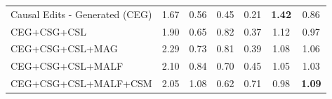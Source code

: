 \begin{table}[ht]
\begin{tabular}{@{}lcccccc@{}}
Causal Edits - Generated (CEG)
& 1.67 & 0.56 & 0.45 & 0.21 & \textbf{1.42} & 0.86 \\

CEG+CSG+CSL
& 1.90 & 0.65 & 0.82 & 0.37 & 1.12 & 0.97 \\

CEG+CSG+CSL+MAG
& 2.29 & 0.73 & 0.81 & 0.39 & 1.08 & 1.06 \\

CEG+CSG+CSL+MALF
& 2.10 & 0.84 & 0.70 & 0.45 & 1.05 & 1.03 \\

CEG+CSG+CSL+MALF+CSM
& 2.05 & 1.08 & 0.62 & 0.71 & 0.98 & \textbf{1.09} \\

\bottomrule
\end{tabular}
\label{tab_sup:Abaltion_scores}
\end{table}
